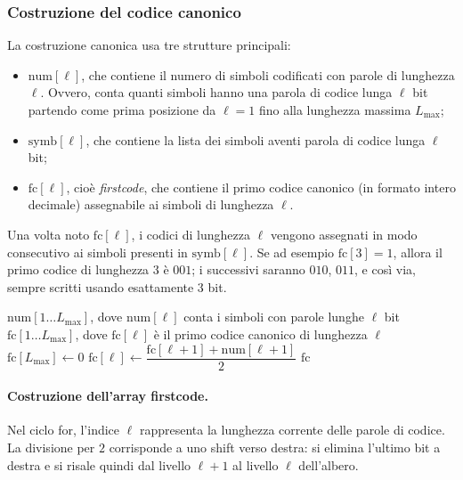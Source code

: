 \documentclass{article}
\theoremstyle{definition}
\numberwithin{equation}{section}
\begin{document}
\subsubsection{Costruzione del codice canonico}
La costruzione canonica usa tre strutture principali:
\begin{itemize}
    \item $\text{num}[\ell]$, che contiene il numero di simboli codificati con parole di lunghezza $\ell$. Ovvero, conta quanti simboli hanno una parola di codice lunga $\ell$ bit partendo come prima posizione da $\ell=1$ fino alla lunghezza massima $L_{\max}$;
    \item $\text{symb}[\ell]$, che contiene la lista dei simboli aventi parola di codice lunga $\ell$ bit;
    \item $\text{fc}[\ell]$, cioè \emph{firstcode}, che contiene il primo codice canonico (in formato intero decimale) assegnabile ai simboli di lunghezza $\ell$.
\end{itemize}

Una volta noto $\text{fc}[\ell]$, i codici di lunghezza $\ell$ vengono assegnati in modo consecutivo ai simboli presenti in $\text{symb}[\ell]$. Se ad esempio $\text{fc}[3]=1$, allora il primo codice di lunghezza $3$ è $001$; i successivi saranno $010$, $011$, e così via, sempre scritti usando esattamente $3$ bit.

\begin{algorithm}[htpb]
    \caption{Costruzione dell'array $\text{fc}$}
    \label{alg:firstcode}
    \begin{algorithmic}[1]
        \Require $\text{num}[1\ldots L_{\max}]$, dove $\text{num}[\ell]$ conta i simboli con parole lunghe $\ell$ bit
        \Ensure $\text{fc}[1\ldots L_{\max}]$, dove $\text{fc}[\ell]$ è il primo codice canonico di lunghezza $\ell$
        \State $\text{fc}[L_{\max}] \gets 0$
        \State $\text{fc}[\ell] \gets \dfrac{\text{fc}[\ell+1]+\text{num}[\ell+1]}{2}$
        \EndFor
        \State \Return $\text{fc}$
    \end{algorithmic}
\end{algorithm}

\paragraph{Costruzione dell'array firstcode.}
Nel ciclo for, l'indice $\ell$ rappresenta la lunghezza corrente delle parole di codice. La divisione per $2$ corrisponde a uno shift verso destra: si elimina l'ultimo bit a destra e si risale quindi dal livello $\ell+1$ al livello $\ell$ dell'albero.
\end{document}

